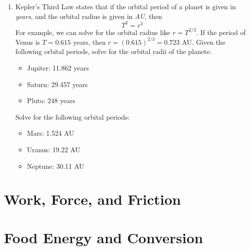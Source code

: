 \documentclass[10pt]{article}
\begin{document}
\begin{enumerate}
\item Kepler's Third Law states that if the orbital period of a planet is given in \textit{years}, and the orbital radius is given in \textit{AU}, then 
\begin{equation}
T^2 = r^3
\end{equation}
For example, we can solve for the orbital radius like $r = T^{2/3}$.  If the period of Venus is $T=0.615$ years, then $r = (0.615)^{2/3} = 0.723$ AU.  Given the following orbital periods, solve for the orbital radii of the planets:
\begin{itemize}
\item Jupiter: 11.862 years
\item Saturn: 29.457 years
\item Pluto: 248 years
\end{itemize}
Solve for the following orbital periods:
\begin{itemize}
\item Mars: 1.524 AU
\item Uranus: 19.22 AU
\item Neptune: 30.11 AU
\end{itemize}
\end{enumerate}

\section{Work, Force, and Friction}

\section{Food Energy and Conversion}
\end{document}
